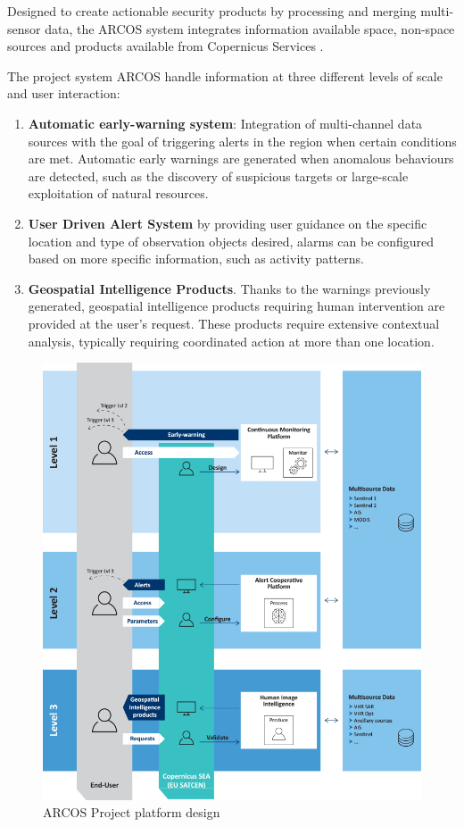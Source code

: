 Designed to create actionable security products by processing and merging multi-sensor data, the ARCOS system integrates information available space, non-space sources and products available from Copernicus Services \cite{copernicus}. 

The project system ARCOS handle information at three different levels of scale and user interaction:

\begin{enumerate}
\item \textbf{Automatic early-warning system}: Integration of multi-channel data sources with the goal of triggering alerts in the region when certain conditions are met. Automatic early warnings are generated when anomalous behaviours are detected, such as the discovery of suspicious targets or large-scale exploitation of natural resources.

\item \textbf{User Driven Alert System} by providing user guidance on the specific location and type of observation objects desired, alarms can be configured based on more specific information, such as activity patterns.

\item \textbf{Geospatial Intelligence Products}. Thanks to the warnings previously generated, geospatial intelligence products requiring human intervention are provided at the user's request. These products require extensive contextual analysis, typically requiring coordinated action at more than one location.
\end{enumerate}

\begin{figure}[H]
    \centering
    \includegraphics[width=13cm]{Images/1/arcos-design.png}
    \caption{ARCOS Project platform design \cite{arcos}}
\end{figure}
    


